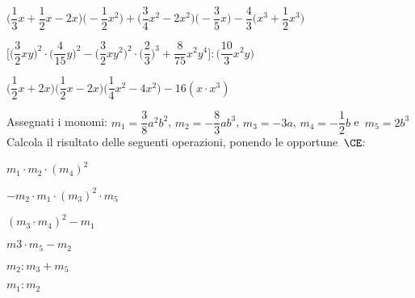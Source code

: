 \begin{esercizio}[\Ast]
\begin{enumeratea}
 \item 
\(\bigg(\dfrac{1}{3}x+\dfrac{1}{2}x-2x\bigg)\bigg(-{\dfrac{1}{2}x^{2}}
\bigg)+\bigg(\dfrac{3}{4}x^{2}-2x^{2}\bigg)\bigg(-{\dfrac{3}{5}x}\bigg)%
 -\dfrac{4}{3}\bigg(x^{3}+\dfrac{1}{2}x^{3}\bigg)\)
  \hfill{}%
%  
 \item 
\(\bigg[\bigg(\dfrac{3}{2}xy\bigg)^{2}\cdot(\dfrac{4}{15}y\bigg)^{2}-\bigg(\dfrac
{3}{2}xy^{2}\bigg)^{2}\cdot\bigg(\dfrac{2}{3}\bigg)^{3}%
 +\dfrac{8}{75}x^{2}y^{4}\bigg]:\bigg(\dfrac{10}{3}x^{2}y\bigg)\)
  \hfill{}
 \item 
\(\bigg(\dfrac{1}{2}x+2x\bigg)\bigg(\dfrac{1}{2}x-2x\bigg)\bigg(\dfrac{1}{4}x^{2}
-4x^{2}\bigg)-16\left(x \cdot x^{3}\right)\)
  \hfill{}
\end{enumeratea}
\end{esercizio}


\begin{esercizio}
 \label{ese:9.37}
Assegnati i monomi:
\(m_{1}=\dfrac{3}{8}a^{2}b^{2}\), \(m_{2}=-{\dfrac{8}{3}}ab^{3}\), \(m_{3}=-3a\), 
\(m_{4}=-{\dfrac{1}{2}}b\) e~\(m_{5}=2b^{3}\)
Calcola il risultato delle seguenti operazioni, ponendo le opportune~\(\CE\):
\begin{multicols}{3}
\begin{enumeratea}
 \item \(m_{1}\cdot m_{2}\cdot (m_{4})^{2}\)
 \item \(-m_{2}\cdot m_{1}\cdot (m_{3})^{2}\cdot m_{5}\)
 \item \((m_{3}\cdot m_{4})^{2}-m_{1}\)
 \item \(m3\cdot m_{5}-m_{2}\)
 \item \(m_{2}:m_{3}+m_{5}\)
 \item \(m_{1}:m_{2}\)
\end{enumeratea}
\end{multicols}
\end{esercizio}


